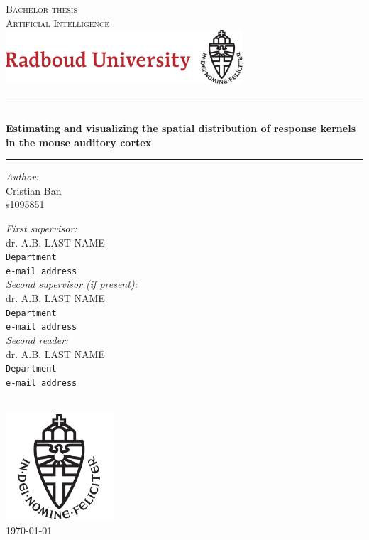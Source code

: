 \documentclass[11pt,a4paper, hidelinks]{report}
\begin{document}
\begin{titlepage}
\begin{center}
\textsc{\LARGE Bachelor thesis}\\ [0.5cm]
\textsc{ \LARGE Artificial Intelligence}\\[0.5cm]
\includegraphics[height=2cm]{RU_Text_&_Logo.jpg}

\vspace{0.4cm}
\hrule \text{}\\[0.4cm]
\textbf{\huge Estimating and visualizing the spatial distribution of response kernels in the mouse auditory cortex}\\[0.4cm]
\hrule
\vspace{2cm}
\begin{minipage}[t]{0.45\textwidth}
	\begin{flushleft} \large
		\textit{Author:}\\
		Cristian Ban\\
		s1095851
	\end{flushleft}
\end{minipage}
\begin{minipage}[t]{0.45\textwidth}
	\begin{flushright} \large
		\textit{First supervisor:}\\
		dr. A.B. LAST NAME\\
		\texttt{Department}\\
		\texttt{e-mail address}\\[1.0cm]
		\textit{Second supervisor (if present):}\\
		dr. A.B. LAST NAME\\
		\texttt{Department}\\
		\texttt{e-mail address}\\[1.0cm]
		\textit{Second reader:}\\
		dr. A.B. LAST NAME\\
		\texttt{Department}\\
		\texttt{e-mail address}\\[1.3cm]
	\end{flushright}
\end{minipage}\\[1cm]
\includegraphics[width=4cm]{Imgs/RU_Logo.png}\\[0.5cm]
{\large \today}
\end{center}
\end{titlepage}
\end{document}
